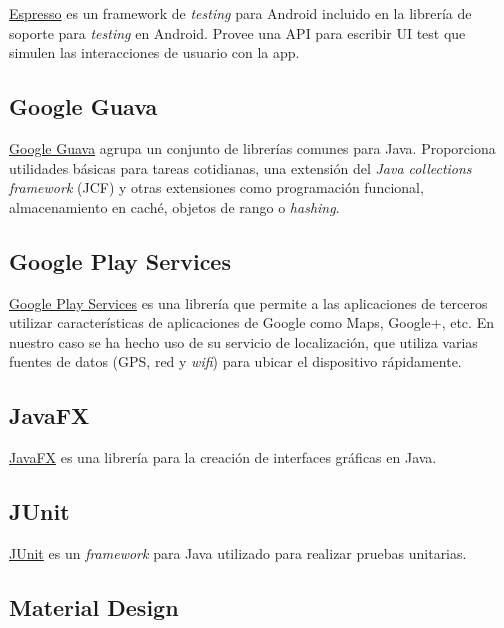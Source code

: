 \href{https://google.github.io/android-testing-support-library/docs/espresso/}{Espresso}
es un framework de \emph{testing} para Android incluido en la librería
de soporte para \emph{testing} en Android. Provee una API para escribir
UI test que simulen las interacciones de usuario con la app.

\subsection{Google Guava}\label{google-guava}

\href{https://github.com/google/guava}{Google Guava} agrupa un conjunto
de librerías comunes para Java. Proporciona utilidades básicas para
tareas cotidianas, una extensión del \emph{Java collections framework}
(JCF) y otras extensiones como programación funcional, almacenamiento en
caché, objetos de rango o \emph{hashing}.

\subsection{Google Play Services}\label{google-play-services}

\href{https://developers.google.com/android/guides/overview}{Google Play
Services} es una librería que permite a las aplicaciones de terceros
utilizar características de aplicaciones de Google como Maps, Google+,
etc. En nuestro caso se ha hecho uso de su servicio de localización, que
utiliza varias fuentes de datos (GPS, red y \emph{wifi}) para ubicar el
dispositivo rápidamente.

\subsection{JavaFX}\label{javafx}

\href{http://docs.oracle.com/javase/8/javase-clienttechnologies.htm}{JavaFX}
es una librería para la creación de interfaces gráficas en Java.

\subsection{JUnit}\label{junit}

\href{http://junit.org/junit4/}{JUnit} es un \emph{framework} para Java
utilizado para realizar pruebas unitarias.

\subsection{Material Design}\label{material-design}

